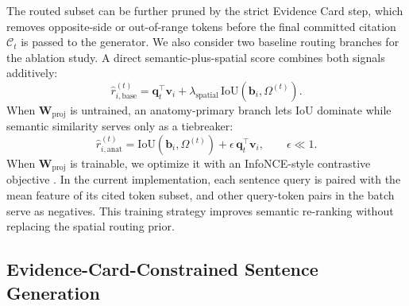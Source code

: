 The routed subset can be further pruned by the strict Evidence Card step, which removes opposite-side or out-of-range tokens before the final committed citation $\mathcal{C}_t$ is passed to the generator. We also consider two baseline routing branches for the ablation study. A direct semantic-plus-spatial score combines both signals additively:
\begin{equation}
\hat{r}_{i,\mathrm{base}}^{(t)}=
\mathbf{q}_t^\top \mathbf{v}_i
+
\lambda_{\mathrm{spatial}}\,\mathrm{IoU}(\mathbf{b}_i,\Omega^{(t)}).
\label{eq:routing_standard_new}
\end{equation}
When $\mathbf{W}_{\mathrm{proj}}$ is untrained, an anatomy-primary branch lets IoU dominate while semantic similarity serves only as a tiebreaker:
\begin{equation}
\hat{r}_{i,\mathrm{anat}}^{(t)}=
\mathrm{IoU}(\mathbf{b}_i,\Omega^{(t)})
+
\epsilon\,\mathbf{q}_t^\top \mathbf{v}_i,
\qquad \epsilon \ll 1.
\label{eq:routing_anatomy_primary_new}
\end{equation}
When $\mathbf{W}_{\mathrm{proj}}$ is trainable, we optimize it with an InfoNCE-style contrastive objective \cite{oord2018cpc,chen2020simclr}. In the current implementation, each sentence query is paired with the mean feature of its cited token subset, and other query-token pairs in the batch serve as negatives. This training strategy improves semantic re-ranking without replacing the spatial routing prior.



\subsection{Evidence-Card-Constrained Sentence Generation}
\label{sec:evidence_card_generation}

